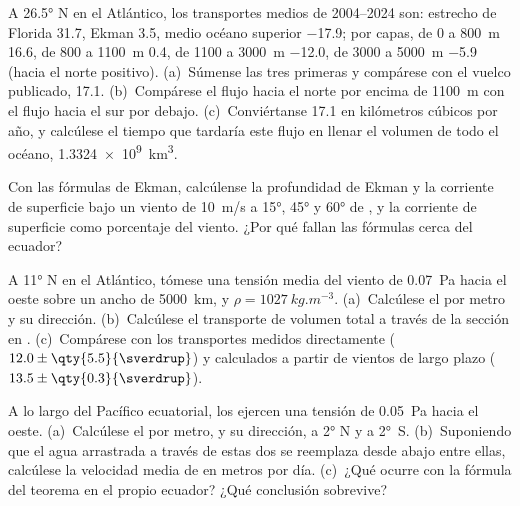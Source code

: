 \begin{exercise}[$\star$]\label{exo:b1:ocean-circulation:3}
A \ang{26.5} N en el Atlántico, los transportes medios de 2004--2024 son: estrecho de Florida \qty{31.7}{\sverdrup}, Ekman \qty{3.5}{\sverdrup}, medio océano superior \qty{-17.9}{\sverdrup}; por capas, de 0 a \qty{800}{m} \qty{16.6}{\sverdrup}, de 800 a \qty{1100}{m} \qty{0.4}{\sverdrup}, de 1100 a \qty{3000}{m} \qty{-12.0}{\sverdrup}, de 3000 a \qty{5000}{m} \qty{-5.9}{\sverdrup} (hacia el norte positivo). (a)~Súmense las tres primeras y compárese con el vuelco publicado, \qty{17.1}{\sverdrup}. (b)~Compárese el flujo hacia el norte por encima de \qty{1100}{m} con el flujo hacia el sur por debajo. (c)~Conviértanse \qty{17.1}{\sverdrup} en kilómetros cúbicos por año, y calcúlese el tiempo que tardaría este flujo en llenar el volumen de todo el océano, \qty{1.3324e9}{km^3}.
\end{exercise}

\begin{exercise}[$\star$]\label{exo:b1:ocean-circulation:4}
Con las fórmulas de Ekman, calcúlense la profundidad de Ekman y la corriente de superficie bajo un viento de \qty{10}{m/s} a \ang{15}, \ang{45} y \ang{60} de , y la corriente de superficie como porcentaje del viento. ¿Por qué fallan las fórmulas cerca del ecuador?
\end{exercise}

\begin{exercise}[$\star\star$]\label{exo:b1:ocean-circulation:5}
A \ang{11} N en el Atlántico, tómese una tensión media del viento de \qty{0.07}{Pa} hacia el oeste sobre un ancho de \qty{5000}{km}, y $\rho = \qty{1027}{kg.m^{-3}}$. (a)~Calcúlese el  por metro y su dirección. (b)~Calcúlese el transporte de volumen total a través de la sección en . (c)~Compárese con los transportes medidos directamente ($12.0 \pm \qty{5.5}{\sverdrup}$) y calculados a partir de vientos de largo plazo ($13.5 \pm \qty{0.3}{\sverdrup}$).
\end{exercise}

\begin{exercise}[$\star\star$]\label{exo:b1:ocean-circulation:6}
A lo largo del Pacífico ecuatorial, los  ejercen una tensión de \qty{0.05}{Pa} hacia el oeste. (a)~Calcúlese el  por metro, y su dirección, a \ang{2} N y a \ang{2}~S. (b)~Suponiendo que el agua arrastrada a través de estas dos  se reemplaza desde abajo entre ellas, calcúlese la velocidad media de  en metros por día. (c)~¿Qué ocurre con la fórmula del teorema en el propio ecuador? ¿Qué conclusión sobrevive?
\end{exercise}

